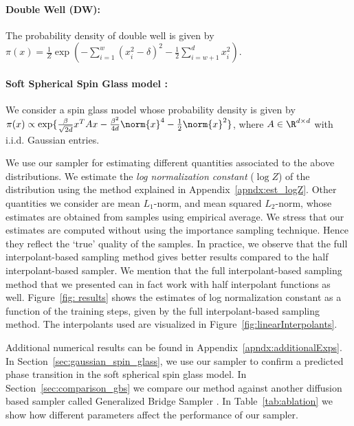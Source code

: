 \paragraph{Double Well (DW):} The probability density of double well is given by $\pi(x) = \frac{1}{Z}\exp\left(-\sum_{i=1}^w(x_i^2-\delta)^2-\frac{1}{2}\sum_{i=w+1}^d x_i^2\right)$.

\paragraph{Soft Spherical Spin Glass model :} We consider a spin glass model whose probability density is given by $\pi(x) \propto \exp\{\frac{\beta}{\sqrt{2d}}x^TAx-\frac{\beta^2}{4d}\norm{x}^4-\frac{1}{2}\norm{x}^2\}$, where $A\in\R^{d\times d}$ with i.i.d. Gaussian entries.

We use our sampler for estimating different quantities associated to the above distributions. We estimate the \textit{log normalization constant} ($\log Z$) of the distribution using the method explained in Appendix~\ref{apndx:est_logZ}. Other quantities we consider are mean $L_1$-norm, and mean squared $L_2$-norm, whose estimates are obtained from samples using empirical average. We stress that our estimates are computed without using the importance sampling technique. Hence they reflect the `true' quality of the samples. In practice, we observe that the full interpolant-based sampling method gives better results compared to the half interpolant-based sampler. We mention that the full interpolant-based sampling method that we presented can in fact work with half interpolant functions as well. Figure~\ref{fig: results} shows the estimates of log normalization constant as a function of the training steps, given by the full interpolant-based sampling method. The interpolants used are visualized in Figure~\ref{fig:linearInterpolants}.

Additional numerical results can be found in Appendix~\ref{apndx:additionalExps}. In Section~\ref{sec:gaussian_spin_glass}, we use our sampler to confirm a predicted phase transition in the soft spherical spin glass model. In Section~\ref{sec:comparison_gbs} we compare our method against another diffusion based sampler called Generalized Bridge Sampler \cite{richter_improved_2023,blessing_beyond_2024}. In Table~\ref{tab:ablation} we show how different parameters affect the performance of our sampler.